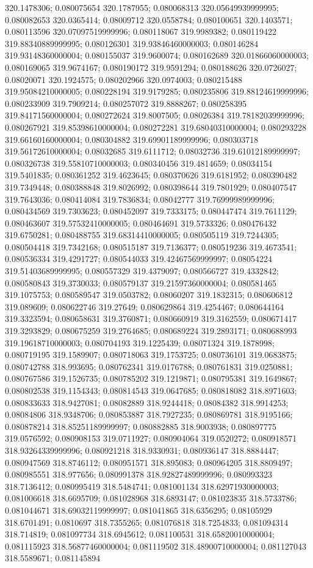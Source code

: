 320.1478306; 0.080075654 320.1787955; 0.080068313 320.05649939999995; 0.080082653 320.0365414; 0.08009712 320.0558784; 0.080100651 320.1403571; 0.080113596 320.07097519999996; 0.080118067 319.9989382; 0.080119422 319.88340889999995; 0.080126301 319.93846460000003; 0.080146284 319.93148360000004; 0.080155037 319.9600074; 0.080162689 320.01866060000003; 0.080169065 319.9674167; 0.080190172 319.9591294; 0.080188626 320.0726027; 0.08020071 320.1924575; 0.080202966 320.0974003; 0.080215488 319.95084210000005; 0.080228194 319.9179285; 0.080235806 319.88124619999996; 0.080233909 319.7909214; 0.080257072 319.8888267; 0.080258395 319.84171560000004; 0.080272624 319.8007505; 0.08026384 319.78182039999996; 0.080267921 319.85398610000004; 0.080272281 319.68040310000004; 0.080293228 319.66160160000004; 0.080304882 319.69901189999996; 0.080303718 319.56172610000004; 0.08032685 319.6111712; 0.08032736 319.61012189999997; 0.080326738 319.55810710000003; 0.080340456 319.4814659; 0.08034154 319.5401835; 0.080361252 319.4623645; 0.080370626 319.6181952; 0.080390482 319.7349448; 0.080388848 319.8026992; 0.080398644 319.7801929; 0.080407547 319.7643036; 0.080414084 319.7836834; 0.08042777 319.76999989999996; 0.080434569 319.7303623; 0.080452097 319.7333175; 0.080447474 319.7611129; 0.080463607 319.57532410000005; 0.080464691 319.5733326; 0.080476432 319.6750281; 0.080488755 319.68314410000005; 0.080505119 319.7244305; 0.080504418 319.7342168; 0.080515187 319.7136377; 0.080519236 319.4673541; 0.080536334 319.4291727; 0.080544033 319.42467569999997; 0.08054224 319.51403689999995; 0.080557329 319.4379097; 0.080566727 319.4332842; 0.080580843 319.3730033; 0.080579137 319.21597360000004; 0.080581465 319.1075753; 0.080589547 319.0503782; 0.08060207 319.1832315; 0.080606812 319.089609; 0.080622746 319.27649; 0.080629864 319.4254467; 0.080644164 319.3323594; 0.080658631 319.3760871; 0.080660919 319.3162559; 0.080671417 319.3293829; 0.080675259 319.2764685; 0.080689224 319.2893171; 0.080688993 319.19618710000003; 0.080704193 319.1225439; 0.08071324 319.1878998; 0.080719195 319.1589907; 0.080718063 319.1753725; 0.080736101 319.0683875; 0.080742788 318.993695; 0.080762341 319.0176788; 0.080761831 319.0250881; 0.080767586 319.1526735; 0.080785202 319.1219871; 0.080795381 319.1649867; 0.080802538 319.1154343; 0.080814543 319.0647685; 0.080818082 318.8971603; 0.080833633 318.9427081; 0.08082889 318.9244418; 0.08084382 318.9914253; 0.08084806 318.9348706; 0.080853887 318.7927235; 0.080869781 318.9195166; 0.080878214 318.85251189999997; 0.080882885 318.9003938; 0.080897775 319.0576592; 0.080908153 319.0711927; 0.080904064 319.0520272; 0.080918571 318.93264339999996; 0.080921218 318.9330931; 0.080936147 318.8884447; 0.080947569 318.8746112; 0.080951571 318.895083; 0.080964205 318.8809497; 0.080985551 318.977656; 0.080991378 318.92827489999996; 0.080993323 318.7136412; 0.080995419 318.5484741; 0.081001134 318.62971930000003; 0.081006618 318.6695709; 0.081028968 318.6893147; 0.081023835 318.5733786; 0.081044671 318.69032119999997; 0.081041865 318.6356295; 0.08105929 318.6701491; 0.0810697 318.7355265; 0.081076818 318.7254833; 0.081094314 318.714819; 0.081097734 318.6945612; 0.081100531 318.65820010000004; 0.081115923 318.56877460000004; 0.081119502 318.48900710000004; 0.081127043 318.5589671; 0.081145894 